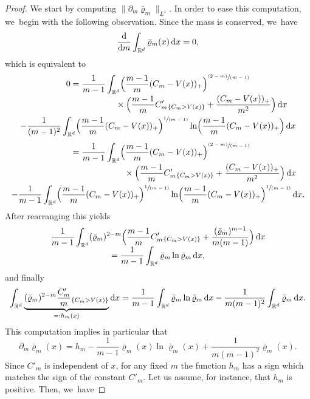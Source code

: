 \documentclass[11pt]{article}
\makeatletter
\numberwithin{equation}{section}
\newcommand{\spfrac}[2]{\sfrac{#1}{(#2)}}
\newcommand{\pspfrac}[2]{\sfrac{(#1)}{(#2)}}
\DeclareRobustCommand{\mathbbm}[1]{\csname jepbb@#1\endcsname}
\let\mathds\mathbbm
\newcommand{\Bprt}[1]{\Bigl(#1\Bigr)}
\newcommand{\dx}[1]{\mathop{}\!\mathrm{d} #1}
\newcommand{\R}{\mathbb{R}}
\theoremstyle{plain}
\theoremstyle{remark}
\makeatother
\begin{document}
\begin{proof}
We start by computing $\|\partial_m \bar\varrho_m\|_{L^1}$. In order to ease this computation, we~begin with the following observation.
Since the mass is conserved, we~have
\begin{align*}
\frac{\dx}{\dx m} \int_{\R^d} \bar\varrho_m(x) \dx x = 0,
\end{align*}
which is equivalent to
\begin{multline*}
0= \frac{1}{m-1}\int_{\R^d} \Bprt{\frac{m-1}{m}(C_m - V(x))_+}^{\pspfrac{2-m}{m-1}}\\[-3pt]
\shoveright{{}\times\Bprt{\frac{m-1}{m}C'_m{\mathds{1}_{\{C_m > V(x)\}}} + \frac{(C_m - V(x))_+}{m^2}} \dx x}\\
- {\frac{1}{(m-1)^{2}}} \int_{\R^d} \Bprt{\frac{m-1}{m}(C_m - V(x))_+}^{\spfrac{1}{m-1}} \ln \Bprt{\frac{m-1}{m}(C_m - V(x))_+} \dx x
\end{multline*}
\begin{multline*}
\hphantom{0} = \frac{1}{m-1}\int_{\R^d} \Bprt{\frac{m-1}{m}(C_m - V(x))_+}^{\pspfrac{2-m}{m-1}}\\[-3pt]
\shoveright{{}\times\Bprt{\frac{m-1}{m}C'_m{\mathds{1}_{\{C_m > V(x)\}}} + \frac{(C_m - V(x))_+}{m^2}} \dx x} \\
- \frac{1}{m-1} \int_{\R^d} \Bprt{\frac{m-1}{m}(C_m - V(x))_+}^{\spfrac{1}{m-1}} \ln \Bprt{\frac{m-1}{m}(C_m - V(x))_+}^{\spfrac{1}{m-1}} \dx x.
\end{multline*}
After rearranging this yields
\begin{multline*}
\frac{1}{m-1}\int_{\R^d} (\bar\varrho_m)^{2-m} \Bprt{\frac{m-1}{m}C'_m{\mathds{1}_{\{C_m > V(x)\}}} + \frac{(\bar\varrho_m)^{m-1}}{m(m-1)}} \dx x\\[-5pt]
= \frac{1}{m-1} \int_{\R^d} \bar\varrho_m \ln \bar\varrho_m \dx x,
\end{multline*}
and finally
\begin{align*}
\int_{\R^d} \underbrace{(\bar\varrho_m)^{2-m} \frac{C'_m}{m}{{\mathds{1}_{\{C_m > V(x)\}}}}}_{=:h_m(x)}\dx x= \frac{1}{m-1} \int_{\R^d} \bar\varrho_m \ln \bar\varrho_m\dx x - \frac{1}{m(m-1)^2}\int_{\R^d} \bar\varrho_m \dx x.
\end{align*}
This computation implies in particular that
\[
\partial_{m}\bar \varrho_m(x) = h_m - \frac{1}{m-1}\bar\varrho_m(x) \ln \bar\varrho_m(x) + \frac{1}{m(m-1)^2}\bar\varrho_m(x).
\]
Since $C'_m$ is independent of $x$, for any fixed $m$ the function $h_m$ has a sign which matches the sign of the constant $C'_{m}$. Let us assume, for instance, that $h_m$ is positive. Then, we~have

\end{proof}
\end{document}
